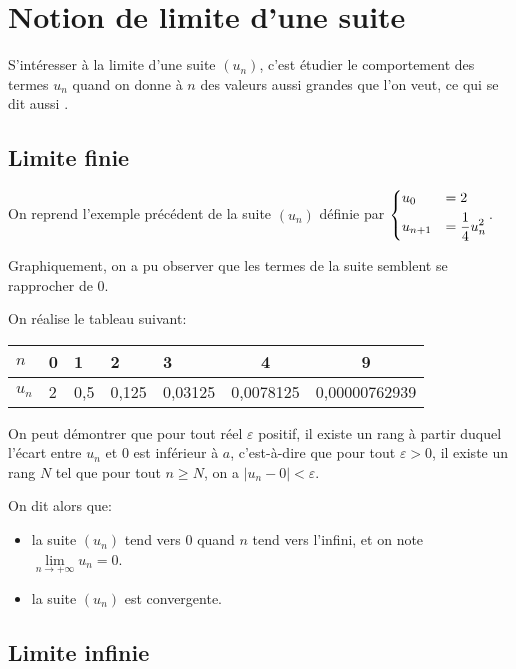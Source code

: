 \documentclass[a4paper]{article}
\begin{document}
    \section{Notion de limite d'une suite}

    S'intéresser à la limite d'une suite $(u_n)$, c'est étudier le comportement des termes $u_n$ quand on donne à 
    $n$ des valeurs aussi grandes que l'on veut, ce qui se dit aussi .

    \subsection{Limite finie}
On reprend l'exemple précédent de la suite $(u_n)$ définie par $\begin{dcases}
  u_0 &= 2\\
  u_{n+1} &= \dfrac{1}{4}u_n^2
\end{dcases}$.

Graphiquement, on a pu observer que les termes de la suite semblent se rapprocher de $0$. 

On réalise le tableau suivant:
\begin{center}
  \begin{tabular}{|*{5}{C{1.2cm}|}c|c|}
      \hline
      $n$ & 0 & 1 & 2 & 3 & 4 & 9 \\
      \hline
      $u_n$ & 2 & 0,5 & 0,125 & 0,03125 & 0,0078125 & 0,00000762939 \\
      \hline
  \end{tabular}
\end{center}

On peut démontrer que pour tout réel $\varepsilon$ positif, il existe un rang à partir duquel l'écart entre $u_n$ et $0$ est inférieur à $a$, 
c'est-à-dire que pour tout $\varepsilon > 0$, il existe un rang $N$ tel que pour tout $n\geq N$, on a $|u_n-0|<\varepsilon$.

On dit alors que:
\begin{itemize}[label=\textbullet]
  \item la suite $(u_n)$ tend vers $0$ quand $n$ tend vers l'infini, et on note $\lim\limits_{n\to +\infty}u_n=0$.
  \item la suite $(u_n)$ est convergente.
\end{itemize}


    \subsection{Limite infinie}
\end{document}
